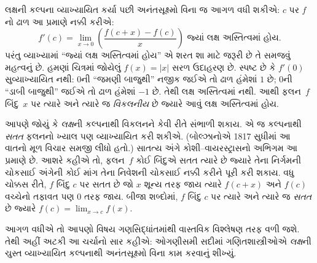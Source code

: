 \documentclass[../../../include/open-logic-section]{subfiles}
\begin{document}
લક્ષની કલ્પના વ્યાખ્યાયિત કર્યા પછી
અનંતસૂક્ષ્મો વિના જ આગળ વધી શકીએ:
$c$ પર $f$નો ઢાળ આ પ્રમાણે નક્કી કરીએ:
\[
	{f}'(c) = \lim_{x \rightarrow 0}\left(\frac{f(c +x) - f(c)}{x}\right) \text{ જ્યાં લક્ષ અસ્તિત્વમાં હોય}.
\]
પરંતુ વ્યાખ્યામાં “જ્યાં લક્ષ અસ્તિત્વમાં હોય”
એ શરત શા માટે જરૂરી છે તે સમજવું મહત્વનું છે.
હમણાં ચિત્રમાં જોયેલું $f(x) = |x|$
સરળ ઉદાહરણ છે. સ્પષ્ટ છે કે $f'(0)$
સુવ્યાખ્યાયિત નથી: $0$ની “જમણી બાજુથી”
નજીક જઈએ તો ઢાળ હંમેશાં $1$ છે;
$0$ની “ડાબી બાજુથી” જઈએ તો ઢાળ
હંમેશાં $-1$ છે. તેથી લક્ષ અસ્તિત્વમાં
નથી. આથી ફલન~$f$ બિંદુ~$x$ પર
ત્યારે અને ત્યારે જ \emph{વિકલનીય}
છે જ્યારે આવું લક્ષ અસ્તિત્વમાં હોય.

આપણે જોયું કે \emph{લક્ષ}ની કલ્પનાથી
વિકલનને કેવી રીતે સંભાળી શકાય.
એ જ કલ્પનાથી \emph{સતત} ફલનનો
ખ્યાલ પણ વ્યાખ્યાયિત કરી શકીએ.
(બોલ્ઝાનોએ 1817 સુધીમાં આ વાતનો
મૂળ વિચાર સમજી લીધો હતો.)
સાતત્ય અંગે કોશી--વાયરસ્ટ્રાસનો
અભિગમ આ પ્રમાણે છે. આશરે કહીએ તો,
ફલન~$f$ કોઈ બિંદુએ સતત ત્યારે છે
જ્યારે તેના નિર્ગમની ચોકસાઈ અંગેની
કોઈ માંગ તેના નિવેશની ચોકસાઈ
નક્કી કરીને પૂરી કરી શકાય.
વધુ ચોક્કસ રીતે, $f$ બિંદુ $c$
પર સતત છે જો $x$ શૂન્ય તરફ
જાય ત્યારે $f(c + x)$ અને $f(c)$
વચ્ચેનો તફાવત પણ $0$ તરફ જાય.
બીજા શબ્દોમાં, $f$ બિંદુ $c$
પર ત્યારે અને ત્યારે જ
\emph{સતત} છે જ્યારે
$f(c) = \lim_{x \rightarrow c} f(x)$.

આગળ વધીએ તો આપણો વિષય ગણસિદ્ધાંતમાંથી
વાસ્તવિક વિશ્લેષણ તરફ વળી જશે. તેથી
અહીં અટકી આ ચર્ચાનો સાર કહીએ:
ઓગણીસમી સદીમાં ગણિતશાસ્ત્રીઓએ
\emph{લક્ષ}ની ચુસ્ત વ્યાખ્યાયિત કલ્પનાથી
અનંતસૂક્ષ્મો વિના કામ કરવાનું શીખ્યું.
\end{document}
